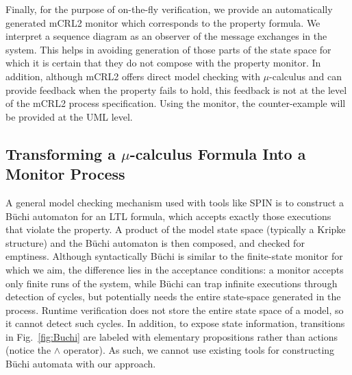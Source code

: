 \documentclass[letter]{llncs}
\begin{document}
Finally, for the purpose of on-the-fly verification, we provide an
automatically generated mCRL2 monitor which corresponds to the property formula.
We interpret a sequence diagram as an observer of
the message exchanges in the system. This helps in avoiding generation of those
parts of the state space for which it is certain that they do not compose with the
property monitor. In addition, although mCRL2 offers direct model checking
with $\mu$-calculus and can provide feedback when the property fails to hold, this
feedback is not at the level of the mCRL2 process specification.
Using the monitor, the counter-example will be provided at the UML level.

\subsection{Transforming a $\mu$-calculus Formula Into a Monitor Process} 
A general model checking mechanism used with tools like SPIN 
is to construct a B\"uchi automaton for an LTL formula, which accepts exactly those executions
that violate the property. A product of the model state space (typically a Kripke structure) and the B\"uchi automaton is then composed, 
and checked for emptiness. 
Although syntactically B\"uchi is similar to the finite-state monitor for which we aim,
the difference lies in the acceptance conditions: a monitor accepts only 
finite runs of the system, while B\"uchi can trap infinite executions through
detection of cycles, but potentially needs the entire state-space
generated in the process. Runtime verification
does not store the entire state space of a model, so it cannot detect such cycles. 
In addition, to expose state information, transitions in Fig.~\ref{fig:Buchi} are labeled with elementary
propositions rather than actions (notice the $\wedge$ operator). 
As such, we cannot use existing tools for constructing B\"uchi automata with our
approach.
\end{document}
